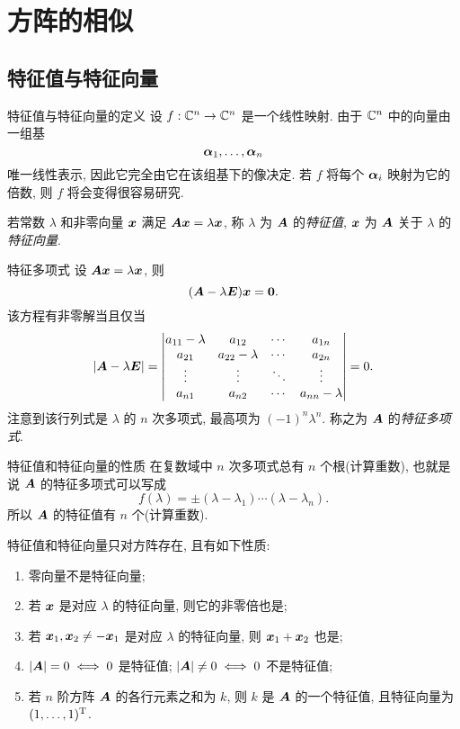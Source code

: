 \section{方阵的相似}

\subsection{特征值与特征向量}

\begin{frame}{特征值与特征向量的定义}
	\onslide<+->
	设 $f:{\mathbb{C}}^n\to {\mathbb{C}}^n$ 是一个线性映射.
	\onslide<+->
	由于 ${\mathbb{C}}^n$ 中的向量由一组基
	\[{\boldsymbol{\alpha}}_1,\dots,{\boldsymbol{\alpha}}_n\]
	唯一线性表示, 因此它完全由它在该组基下的像决定.
	\onslide<+->
	若 $f$ 将每个 ${\boldsymbol{\alpha}}_i$ 映射为它的倍数, 则 $f$ 将会变得很容易研究.

	\onslide<+->
	\begin{definition}
		若常数 $\lambda$ 和非零向量 ${\boldsymbol{x}}$ 满足 ${\boldsymbol{A}}{\boldsymbol{x}}=\lambda{\boldsymbol{x}}$, 称 $\lambda$ 为 ${\boldsymbol{A}}$ 的\emph{特征值}, ${\boldsymbol{x}}$ 为 ${\boldsymbol{A}}$ 关于 $\lambda$ 的\emph{特征向量}.
	\end{definition}
\end{frame}


\begin{frame}{特征多项式}
	\onslide<+->
	设 ${\boldsymbol{A}}{\boldsymbol{x}}=\lambda{\boldsymbol{x}}$, 则
	\[({\boldsymbol{A}}-\lambda{\boldsymbol{E}}){\boldsymbol{x}}={\bf0}.\]
	\onslide<+->
	该方程有非零解当且仅当
	\[|{\boldsymbol{A}}-\lambda{\boldsymbol{E}}|=\begin{vmatrix}
		a_{11}-\lambda&a_{12}&\cdots&a_{1n}\\
		a_{21}&a_{22}-\lambda&\cdots&a_{2n}\\
		\vdots&\vdots&\ddots&\vdots\\
		a_{n1}&a_{n2}&\cdots&a_{nn}-\lambda
	\end{vmatrix}=0.\]
	\onslide<+->
	注意到该行列式是 $\lambda$ 的 $n$ 次多项式, 最高项为 $(-1)^n\lambda^n$.
	\onslide<+->
	称之为 ${\boldsymbol{A}}$ 的\emph{特征多项式}.
\end{frame}


\begin{frame}{特征值和特征向量的性质}
	\onslide<+->
	在复数域中 $n$ 次多项式总有 $n$ 个根(计算重数),
	\onslide<+->
	也就是说 ${\boldsymbol{A}}$ 的特征多项式可以写成
	\[f(\lambda)=\pm(\lambda-\lambda_1)\cdots(\lambda-\lambda_n).\]
	\onslide<+->
	所以 ${\boldsymbol{A}}$ 的\alert{特征值有 $n$ 个(计算重数)}.

	\onslide<+->
	特征值和特征向量只对方阵存在, 且有如下性质:
	\begin{enumerate}
		\item 零向量不是特征向量;
		\item 若 ${\boldsymbol{x}}$ 是对应 $\lambda$ 的特征向量, 则它的非零倍也是;
		\item 若 ${\boldsymbol{x}}_1,{\boldsymbol{x}}_2\neq-{\boldsymbol{x}}_1$ 是对应 $\lambda$ 的特征向量, 则 ${\boldsymbol{x}}_1+{\boldsymbol{x}}_2$ 也是;
		\item $|{\boldsymbol{A}}|=0\iff 0$ 是特征值; $|{\boldsymbol{A}}|\neq0\iff 0$ 不是特征值;
		\item 若 $n$ 阶方阵 ${\boldsymbol{A}}$ 的各行元素之和为 $k$, 则 $k$ 是 ${\boldsymbol{A}}$ 	的一个特征值, 且特征向量为 $(1,\dots,1)^{\mathrm{T}}$.
	\end{enumerate}
\end{frame}


